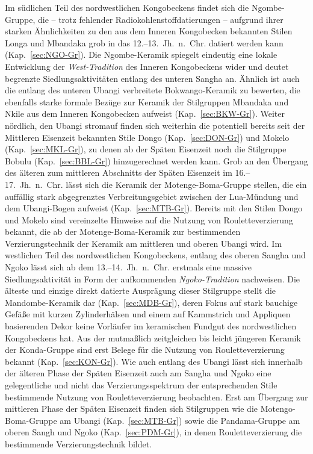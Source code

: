 Im südlichen Teil des nordwestlichen Kongobeckens findet sich die Ngombe-Gruppe, die -- trotz fehlender Radiokohlenstoffdatierungen -- aufgrund ihrer starken Ähnlichkeiten zu den aus dem Inneren Kongobecken bekannten Stilen Longa und Mbandaka grob in das 12.--13.~Jh.~n.~Chr. datiert werden kann (Kap.~\ref{sec:NGO-Gr}). Die Ngombe-Keramik spiegelt eindeutig eine lokale Entwicklung der \textit{West-Tradition} des Inneren Kongobeckens wider und deutet begrenzte Siedlungsaktivitäten entlang des unteren Sangha an. Ähnlich ist auch die entlang des unteren Ubangi verbreitete Bokwango-Keramik zu bewerten, die ebenfalls starke formale Bezüge zur Keramik der Stilgruppen Mbandaka und Nkile aus dem Inneren Kongobecken aufweist (Kap.~\ref{sec:BKW-Gr}). Weiter nördlich, den Ubangi stromauf finden sich weiterhin die potentiell bereits seit der Mittleren Eisenzeit bekannten Stile Dongo (Kap.~\ref{sec:DON-Gr}) und Mokelo (Kap.~\ref{sec:MKL-Gr}), zu denen ab der Späten Eisenzeit noch die Stilgruppe Bobulu (Kap.~\ref{sec:BBL-Gr}) hinzugerechnet werden kann. Grob an den Übergang des älteren zum mittleren Abschnitts der Späten Eisenzeit im 16.--17.~Jh.~n.~Chr. lässt sich die Keramik der Motenge-Boma-Gruppe stellen, die ein auffällig stark abgegrenztes Verbreitungsgebiet zwischen der Lua-Mündung und dem Ubangi-Bogen aufweist (Kap.~\ref{sec:MTB-Gr}). Bereits mit den Stilen Dongo und Mokelo sind vereinzelte Hinweise auf die Nutzung von Rouletteverzierung bekannt, die ab der Motenge-Boma-Keramik zur bestimmenden Verzierungstechnik der Keramik am mittleren und oberen Ubangi wird. Im westlichen Teil des nordwestlichen Kongobeckens, entlang des oberen Sangha und Ngoko lässt sich ab dem 13.--14.~Jh.~n.~Chr. erstmals eine massive Siedlungsaktivität in Form der aufkommenden \textit{Ngoko-Tradition} nachweisen. Die älteste und einzige direkt datierte Ausprägung dieser Stilgruppe stellt die Mandombe-Keramik dar (Kap.~\ref{sec:MDB-Gr}), deren Fokus auf stark bauchige Gefäße mit kurzen Zylinderhälsen und einem auf Kammstrich und Appliquen basierenden Dekor keine Vorläufer im keramischen Fundgut des nordwestlichen Kongobeckens hat. Aus der mutmaßlich zeitgleichen bis leicht jüngeren Keramik der Konda-Gruppe sind erst Belege für die Nutzung von Rouletteverzierung bekannt (Kap.~\ref{sec:KON-Gr}). Wie auch entlang des Ubangi lässt sich innerhalb der älteren Phase der Späten Eisenzeit auch am Sangha und Ngoko eine gelegentliche und nicht das Verzierungsspektrum der entsprechenden Stile bestimmende Nutzung von Rouletteverzierung beobachten. Erst am Übergang zur mittleren Phase der Späten Eisenzeit finden sich Stilgruppen wie die Motengo-Boma-Gruppe am Ubangi (Kap.~\ref{sec:MTB-Gr}) sowie die Pandama-Gruppe am oberen Sangh und Ngoko (Kap.~\ref{sec:PDM-Gr}), in denen Rouletteverzierung die bestimmende Verzierungstechnik bildet.

